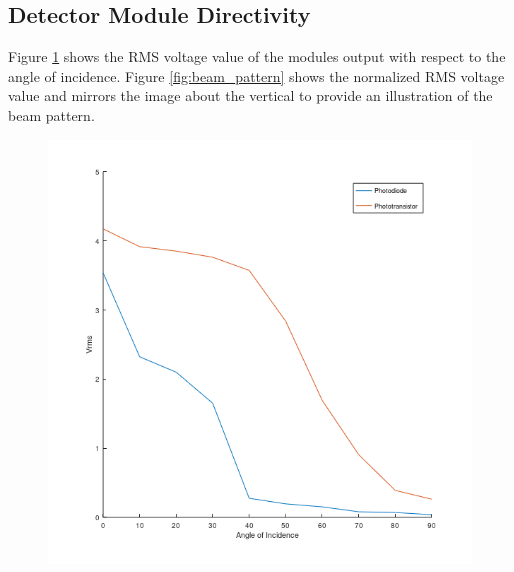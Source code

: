 \subsection{Detector Module Directivity}

Figure \ref{fig:vrms_vs_angle_of_incidence} shows the RMS voltage value of the modules output with respect to the angle of incidence. Figure \ref{fig:beam_pattern} shows the normalized RMS voltage value and mirrors the image about the vertical to provide an illustration of the beam pattern.


\begin{figure}[H]
	\centering
	\begin{minipage}{.4\linewidth}
		\centering
		\includegraphics[width=\textwidth]{figures/results/vrms_vs_incidence_square.png}
		\label{fig:vrms_vs_angle_of_incidence}
	\end{minipage}
	\hspace{.1\linewidth}
	\begin{minipage}{.4\linewidth}
		\centering

\end{minipage}
\end{figure}
